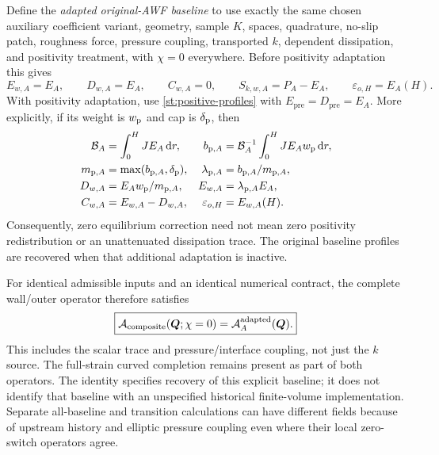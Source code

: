 \documentclass[11pt,a4paper]{article}
\numberwithin{equation}{section}
\newcommand{\eps}{\varepsilon}
\newcommand{\dd}{\mathrm d}
\begin{document}
Define the \emph{adapted original-AWF baseline} to use exactly the
same chosen auxiliary coefficient variant, geometry, sample $K$,
spaces, quadrature, no-slip patch, roughness force, pressure coupling,
transported $k$, dependent dissipation, and positivity treatment,
with $\chi=0$ everywhere.  Before positivity adaptation this gives
\begin{equation}
 E_{w,A}=E_A,\qquad D_{w,A}=E_A,\qquad C_{w,A}=0,
 \qquad S_{k,w,A}=P_A-E_A,
 \qquad\eps_{o,H}=E_A(H).
 \label{geo:adapted-baseline}
\end{equation}
With positivity adaptation, use \cref{st:positive-profiles} with
$E_{\mathrm{pre}}=D_{\mathrm{pre}}=E_A$.  More explicitly, if its
weight is $w_{\rm p}$ and cap is $\delta_{\rm p}$, then
\begin{equation}
 \begin{aligned}
 \mathcal B_A&=\int_0^HJE_A\,\dd r,&
 b_{{\rm p},A}&=\mathcal B_A^{-1}\int_0^HJE_Aw_{\rm p}\,\dd r,\\
 m_{{\rm p},A}&=\max(b_{{\rm p},A},\delta_{\rm p}),&
 \lambda_{{\rm p},A}&=b_{{\rm p},A}/m_{{\rm p},A},\\
 D_{w,A}&=E_Aw_{\rm p}/m_{{\rm p},A},&
 E_{w,A}&=\lambda_{{\rm p},A}E_A,\\
 C_{w,A}&=E_{w,A}-D_{w,A},&
 \eps_{o,H}&=E_{w,A}(H).
 \end{aligned}
 \label{geo:positive-baseline}
\end{equation}
Consequently, zero equilibrium correction need not mean zero
positivity redistribution or an unattenuated dissipation trace.
The original baseline profiles are recovered when that additional
adaptation is inactive.

For identical admissible inputs and an identical numerical contract,
the complete wall/outer operator therefore satisfies
\begin{equation}
 \boxed{\mathcal A_{\rm composite}(\boldsymbol Q;\chi=0)
        =\mathcal A_{A}^{\rm adapted}(\boldsymbol Q).}
 \label{geo:baseline-identity}
\end{equation}
This includes the scalar trace and pressure/interface coupling,
not just the $k$ source.  The full-strain curved completion remains
present as part of both operators.  The identity specifies recovery
of this explicit baseline; it does not identify that baseline with
an unspecified historical finite-volume implementation.  Separate
all-baseline and transition calculations can have different fields
because of upstream history and elliptic pressure coupling even
where their local zero-switch operators agree.
\end{document}
